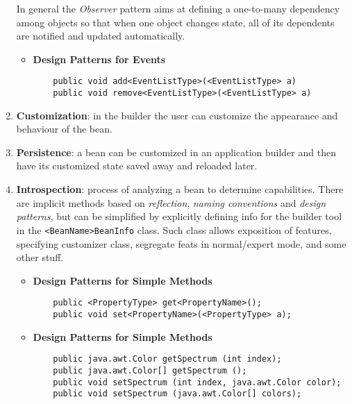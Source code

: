 \begin{enumerate}
    In general the \textit{Observer} pattern aims at defining a one-to-many dependency among objects so that when one object changes state, all of its dependents are notified and updated automatically.
    \begin{itemize}
        \item \textbf{Design Patterns for Events}
        \begin{lstlisting}
    public void add<EventListType>(<EventListType> a)
    public void remove<EventListType>(<EventListType> a)
        \end{lstlisting}
    \end{itemize}
    \item \textbf{Customization}: in the builder the user can customize the appearance and behaviour of the bean.
    \item \textbf{Persistence}: a bean can be customized in an application builder and then have its customized state saved away and reloaded later. 
    \item \textbf{Introspection}: process of analyzing a bean to determine capabilities.
    There are implicit methods based on \textit{reflection}, \textit{naming conventions} and \textit{design patterns},
    but can be simplified by explicitly defining info for the builder tool in the \lstinline{<BeanName>BeanInfo} class.
    Such class allows exposition of features, specifying customizer class, segregate feats in normal/expert mode, and some other stuff.
    \begin{itemize}
        \item \textbf{Design Patterns for Simple Methods}
        \begin{lstlisting}
    public <PropertyType> get<PropertyName>();
    public void set<PropertyName>(<PropertyType> a);
        \end{lstlisting}
        \item \textbf{Design Patterns for Simple Methods}
        \begin{lstlisting}
    public java.awt.Color getSpectrum (int index);
    public java.awt.Color[] getSpectrum ();
    public void setSpectrum (int index, java.awt.Color color);
    public void setSpectrum (java.awt.Color[] colors);
        \end{lstlisting}
    \end{itemize}
    
\end{enumerate}

